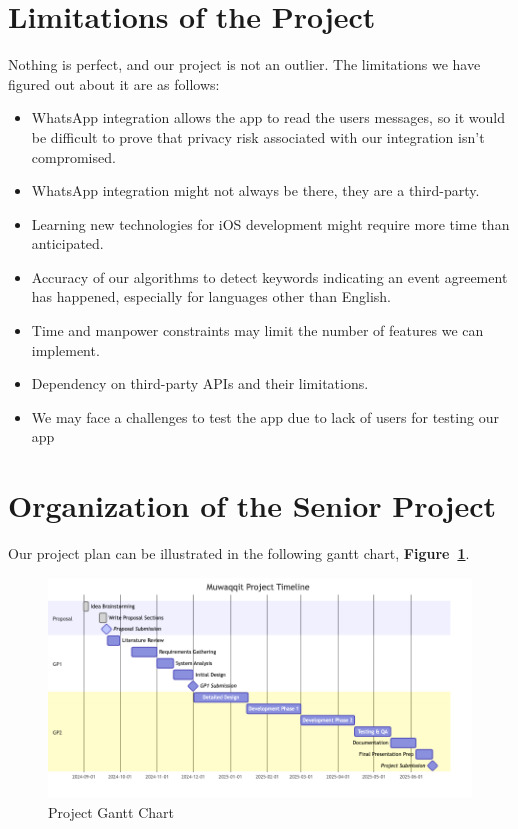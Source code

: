 \documentclass[12pt,a4paper]{report}
\begin{document}
\section{Limitations of the Project}

Nothing is perfect, and our project is not an outlier. The limitations we have figured out about it are as follows:
\begin{itemize}
    \item WhatsApp integration allows the app to read the users messages, so it would be difficult to prove that privacy risk associated with our integration isn't compromised.
    \item WhatsApp integration might not always be there, they are a third-party.
    \item Learning new technologies for iOS development might require more time than anticipated.
    \item Accuracy of our algorithms to detect keywords indicating an event agreement has happened, especially for languages other than English.
    \item Time and manpower constraints may limit the number of features we can implement.
    \item Dependency on third-party APIs and their limitations.
    \item We may face a challenges to test the app due to lack of users for testing our app
\end{itemize}

\newpage

\section{Organization of the Senior Project}

Our project plan can be illustrated in the following gantt chart, \textbf{Figure~\ref{fig:project-gantt-chart}}.

\begin{figure}[!h]
    \centering
    \includegraphics[width=\textwidth]{images/gantt.png}
    \caption{Project Gantt Chart}
    \label{fig:project-gantt-chart}
\end{figure}
\end{document}
